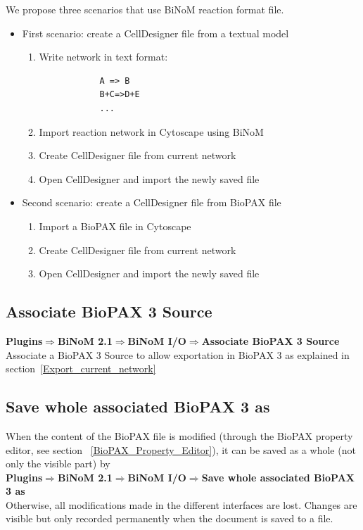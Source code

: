We propose three scenarios that use BiNoM reaction format file.
\begin{itemize}
\item First scenario: create a CellDesigner file from a textual model
	\begin{enumerate}
		\item Write network in text format:
			\begin{verbatim}
			A => B
			B+C=>D+E
			...
			\end{verbatim}
		\item Import reaction network in Cytoscape using BiNoM
		\item Create CellDesigner file from current network
		\item Open CellDesigner and import the newly saved file
	\end{enumerate}
\item Second scenario: create a CellDesigner file from BioPAX file
	\begin{enumerate}
		\item Import a BioPAX file in Cytoscape
		\item Create CellDesigner file from current network
		\item Open CellDesigner and import the newly saved file
	\end{enumerate}
\end{itemize}


\subsection{Associate BioPAX 3 Source} \label{Associate_BioPAX_Source}
\textbf{Plugins$\Rightarrow$BiNoM 2.1$\Rightarrow$BiNoM I/O$\Rightarrow$Associate BioPAX 3 Source}\\
Associate a BioPAX 3 Source to allow exportation in BioPAX 3 as explained in section~\ref{Export_current_network}




\subsection{Save whole associated BioPAX 3 as}
When the content of the BioPAX file is modified (through the BioPAX property editor, see section ~\ref{BioPAX_Property_Editor}), it can be saved as a whole (not only the visible part) by\\
\textbf{Plugins$\Rightarrow$BiNoM 2.1$\Rightarrow$BiNoM I/O$\Rightarrow$Save whole associated BioPAX 3 as}\\
Otherwise, all modifications made in the different interfaces are lost. Changes are visible but only recorded permanently when the document is saved to a file.



